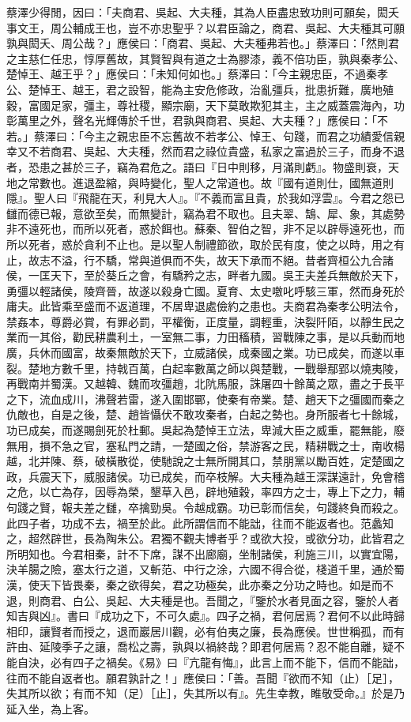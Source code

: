 \begin{pinyinscope}
蔡澤少得閒，因曰：「夫商君、吳起、大夫種，其為人臣盡忠致功則可願矣，閎夭事文王，周公輔成王也，豈不亦忠聖乎？以君臣論之，商君、吳起、大夫種其可願孰與閎夭、周公哉？」應侯曰：「商君、吳起、大夫種弗若也。」蔡澤曰：「然則君之主慈仁任忠，惇厚舊故，其賢智與有道之士為膠漆，義不倍功臣，孰與秦孝公、楚悼王、越王乎？」應侯曰：「未知何如也。」蔡澤曰：「今主親忠臣，不過秦孝公、楚悼王、越王，君之設智，能為主安危修政，治亂彊兵，批患折難，廣地殖穀，富國足家，彊主，尊社稷，顯宗廟，天下莫敢欺犯其主，主之威蓋震海內，功彰萬里之外，聲名光輝傳於千世，君孰與商君、吳起、大夫種？」應侯曰：「不若。」蔡澤曰：「今主之親忠臣不忘舊故不若孝公、悼王、句踐，而君之功績愛信親幸又不若商君、吳起、大夫種，然而君之祿位貴盛，私家之富過於三子，而身不退者，恐患之甚於三子，竊為君危之。語曰『日中則移，月滿則虧』。物盛則衰，天地之常數也。進退盈縮，與時變化，聖人之常道也。故『國有道則仕，國無道則隱』。聖人曰『飛龍在天，利見大人』。『不義而富且貴，於我如浮雲』。今君之怨已讎而德已報，意欲至矣，而無變計，竊為君不取也。且夫翠、鵠、犀、象，其處勢非不遠死也，而所以死者，惑於餌也。蘇秦、智伯之智，非不足以辟辱遠死也，而所以死者，惑於貪利不止也。是以聖人制禮節欲，取於民有度，使之以時，用之有止，故志不溢，行不驕，常與道俱而不失，故天下承而不絕。昔者齊桓公九合諸侯，一匡天下，至於葵丘之會，有驕矜之志，畔者九國。吳王夫差兵無敵於天下，勇彊以輕諸侯，陵齊晉，故遂以殺身亡國。夏育、太史噭叱呼駭三軍，然而身死於庸夫。此皆乘至盛而不返道理，不居卑退處儉約之患也。夫商君為秦孝公明法令，禁姦本，尊爵必賞，有罪必罰，平權衡，正度量，調輕重，決裂阡陌，以靜生民之業而一其俗，勸民耕農利土，一室無二事，力田稸積，習戰陳之事，是以兵動而地廣，兵休而國富，故秦無敵於天下，立威諸侯，成秦國之業。功已成矣，而遂以車裂。楚地方數千里，持戟百萬，白起率數萬之師以與楚戰，一戰舉鄢郢以燒夷陵，再戰南并蜀漢。又越韓、魏而攻彊趙，北阬馬服，誅屠四十餘萬之眾，盡之于長平之下，流血成川，沸聲若雷，遂入圍邯鄲，使秦有帝業。楚、趙天下之彊國而秦之仇敵也，自是之後，楚、趙皆懾伏不敢攻秦者，白起之勢也。身所服者七十餘城，功已成矣，而遂賜劍死於杜郵。吳起為楚悼王立法，卑減大臣之威重，罷無能，廢無用，損不急之官，塞私門之請，一楚國之俗，禁游客之民，精耕戰之士，南收楊越，北并陳、蔡，破橫散從，使馳說之士無所開其口，禁朋黨以勵百姓，定楚國之政，兵震天下，威服諸侯。功已成矣，而卒枝解。大夫種為越王深謀遠計，免會稽之危，以亡為存，因辱為榮，墾草入邑，辟地殖穀，率四方之士，專上下之力，輔句踐之賢，報夫差之讎，卒擒勁吳。令越成霸。功已彰而信矣，句踐終負而殺之。此四子者，功成不去，禍至於此。此所謂信而不能詘，往而不能返者也。范蠡知之，超然辟世，長為陶朱公。君獨不觀夫博者乎？或欲大投，或欲分功，此皆君之所明知也。今君相秦，計不下席，謀不出廊廟，坐制諸侯，利施三川，以實宜陽，決羊腸之險，塞太行之道，又斬范、中行之涂，六國不得合從，棧道千里，通於蜀漢，使天下皆畏秦，秦之欲得矣，君之功極矣，此亦秦之分功之時也。如是而不退，則商君、白公、吳起、大夫種是也。吾聞之，『鑒於水者見面之容，鑒於人者知吉與凶』。書曰『成功之下，不可久處』。四子之禍，君何居焉？君何不以此時歸相印，讓賢者而授之，退而巖居川觀，必有伯夷之廉，長為應侯。世世稱孤，而有許由、延陵季子之讓，喬松之壽，孰與以禍終哉？即君何居焉？忍不能自離，疑不能自決，必有四子之禍矣。《易》曰『亢龍有悔』，此言上而不能下，信而不能詘，往而不能自返者也。願君孰計之！」應侯曰：「善。吾聞『欲而不知（止）［足］，失其所以欲；有而不知（足）［止］，失其所以有』。先生幸教，睢敬受命。』於是乃延入坐，為上客。


\end{pinyinscope}
